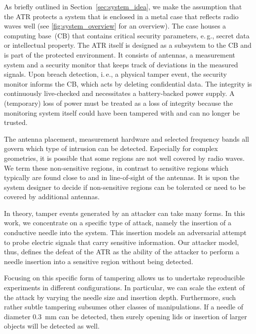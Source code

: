 \documentclass[conference]{IEEEtran}
\makeatletter
\newcommand{\ie}{i.\@\,e.\@\xspace}
\newcommand{\eg}{e.\@\,g.\@\xspace}
\makeatother
\begin{document}
As briefly outlined in Section~\ref{sec:system_idea}, we make the assumption that the ATR protects a system that is enclosed in a metal case that reflects radio waves well (see \autoref{fig:system_overview} for an overview). The case houses a computing base~(CB) that contains critical security parameters, \eg, secret data or intellectual property. The ATR itself is designed as a subsystem to the CB and is part of the protected environment. It consists of antennas, a measurement system and a security monitor that keeps track of deviations in the measured signals. Upon breach detection, \ie, a physical tamper event, the security monitor informs the CB, which acts by deleting confidential data. The integrity is continuously live-checked and necessitates a battery-backed power supply. A (temporary) loss of power must be treated as a loss of integrity because the monitoring system itself could have been tampered with and can no longer be trusted.

The antenna placement, measurement hardware and selected frequency bands all govern which type of intrusion can be detected. Especially for complex geometries, it is possible that some regions are not well covered by radio waves. We term these non-sensitive regions, in contrast to sensitive regions which typically are found close to and in line-of-sight of the antennas. It is upon the system designer to decide if non-sensitive regions can be tolerated or need to be covered by additional antennas.

In theory, tamper events generated by an attacker can take many forms. In this work, we concentrate on a specific type of attack, namely the insertion of a conductive needle into the system. This insertion models an adversarial attempt to probe electric signals that carry sensitive information. Our attacker model, thus, defines the defeat of the ATR as the ability of the attacker to perform a needle insertion into a sensitive region without being detected.

Focusing on this specific form of tampering allows us to undertake reproducible experiments in different configurations. In particular, we can scale the extent of the attack by varying the needle size and insertion depth. Furthermore, such rather subtle tampering subsumes other classes of manipulations. If a needle of diameter \SI{0.3}{\mm} can be detected, then surely opening lids or insertion of larger objects will be detected as well.
\end{document}
